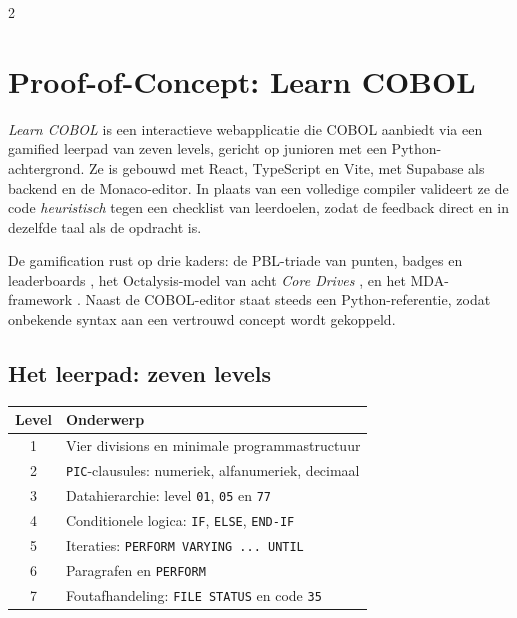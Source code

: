 \documentclass[a0,portrait]{hogent-poster}
\begin{document}
\begin{multicols}{2}
\section{Proof-of-Concept: Learn COBOL}

\textit{Learn COBOL} is een interactieve webapplicatie die COBOL aanbiedt via een gamified leerpad van zeven levels, gericht op junioren met een Python-achtergrond. Ze is gebouwd met React, TypeScript en Vite, met Supabase als backend en de Monaco-editor. In plaats van een volledige compiler valideert ze de code \emph{heuristisch} tegen een checklist van leerdoelen, zodat de feedback direct en in dezelfde taal als de opdracht is.

De gamification rust op drie kaders: de PBL-triade van punten, badges en leaderboards \autocite{KevinWerbach2020}, het Octalysis-model van acht \textit{Core Drives} \autocite{Chou2015}, en het MDA-framework \autocite{Hunicke2004}. Naast de COBOL-editor staat steeds een Python-referentie, zodat onbekende syntax aan een vertrouwd concept wordt gekoppeld.

\subsection{Het leerpad: zeven levels}

\begin{center}
\small
\begin{tabularx}{\linewidth}{@{}c X@{}}
\toprule
\textbf{Level} & \textbf{Onderwerp} \\
\midrule
1 & Vier divisions en minimale programmastructuur \\
2 & \texttt{PIC}-clausules: numeriek, alfanumeriek, decimaal \\
3 & Datahierarchie: level \texttt{01}, \texttt{05} en \texttt{77} \\
4 & Conditionele logica: \texttt{IF}, \texttt{ELSE}, \texttt{END-IF} \\
5 & Iteraties: \texttt{PERFORM VARYING ... UNTIL} \\
6 & Paragrafen en \texttt{PERFORM} \\
7 & Foutafhandeling: \texttt{FILE STATUS} en code \texttt{35} \\
\bottomrule
\end{tabularx}
\end{center}


\end{multicols}
\end{document}
